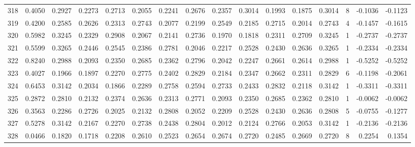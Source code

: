 \begin{tabular}{lrrrrrrrrrrrrrrr}
318 &      0.4050 &  0.2927 &  0.2273 &  0.2713 &  0.2055 &  0.2241 &  0.2676 &  0.2357 &  0.3014 &  0.1993 &   0.1875 &     0.3014 &      8 &                   -0.1036 &                    -0.1123 \\
319 &      0.4200 &  0.2585 &  0.2626 &  0.2313 &  0.2743 &  0.2077 &  0.2199 &  0.2549 &  0.2185 &  0.2715 &   0.2014 &     0.2743 &      4 &                   -0.1457 &                    -0.1615 \\
320 &      0.5982 &  0.3245 &  0.2329 &  0.2908 &  0.2067 &  0.2141 &  0.2736 &  0.1970 &  0.1818 &  0.2311 &   0.2709 &     0.3245 &      1 &                   -0.2737 &                    -0.2737 \\
321 &      0.5599 &  0.3265 &  0.2446 &  0.2545 &  0.2386 &  0.2781 &  0.2046 &  0.2217 &  0.2528 &  0.2430 &   0.2636 &     0.3265 &      1 &                   -0.2334 &                    -0.2334 \\
322 &      0.8240 &  0.2988 &  0.2093 &  0.2350 &  0.2685 &  0.2362 &  0.2796 &  0.2042 &  0.2247 &  0.2661 &   0.2614 &     0.2988 &      1 &                   -0.5252 &                    -0.5252 \\
323 &      0.4027 &  0.1966 &  0.1897 &  0.2270 &  0.2775 &  0.2402 &  0.2829 &  0.2184 &  0.2347 &  0.2662 &   0.2311 &     0.2829 &      6 &                   -0.1198 &                    -0.2061 \\
324 &      0.6453 &  0.3142 &  0.2034 &  0.1866 &  0.2289 &  0.2758 &  0.2594 &  0.2733 &  0.2433 &  0.2832 &   0.2118 &     0.3142 &      1 &                   -0.3311 &                    -0.3311 \\
325 &      0.2872 &  0.2810 &  0.2132 &  0.2374 &  0.2636 &  0.2313 &  0.2771 &  0.2093 &  0.2350 &  0.2685 &   0.2362 &     0.2810 &      1 &                   -0.0062 &                    -0.0062 \\
326 &      0.3563 &  0.2286 &  0.2726 &  0.2025 &  0.2132 &  0.2808 &  0.2052 &  0.2209 &  0.2528 &  0.2430 &   0.2636 &     0.2808 &      5 &                   -0.0755 &                    -0.1277 \\
327 &      0.5278 &  0.3142 &  0.2167 &  0.2270 &  0.2738 &  0.2438 &  0.2804 &  0.2012 &  0.2124 &  0.2766 &   0.2053 &     0.3142 &      1 &                   -0.2136 &                    -0.2136 \\
328 &      0.0466 &  0.1820 &  0.1718 &  0.2208 &  0.2610 &  0.2523 &  0.2654 &  0.2674 &  0.2720 &  0.2485 &   0.2669 &     0.2720 &      8 &                    0.2254 &                     0.1354 \\

\end{tabular}
